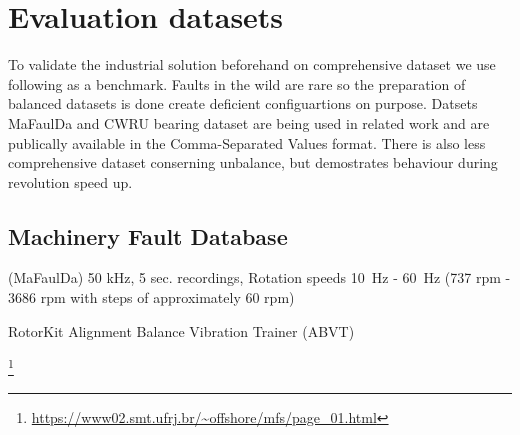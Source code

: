 \section{Evaluation datasets}



To validate the industrial solution beforehand on comprehensive dataset we use following as a benchmark.  Faults in the wild are rare so the preparation of balanced datasets is done create deficient configuartions on purpose. Datsets MaFaulDa and CWRU bearing dataset are being used in related work and are publically available in the Comma-Separated Values format. There is also less comprehensive dataset conserning unbalance, but demostrates behaviour during revolution speed up.  

\subsection{Machinery Fault Database}
(MaFaulDa)
50 kHz, 5 sec. recordings, 
Rotation speeds 10~Hz - 60~Hz (737 rpm - 3686 rpm with steps of approximately 60 rpm)







RotorKit Alignment Balance Vibration Trainer (ABVT)
\cite{pestana-viana_influence_2016}
\cite{ribeiro_rotating_2017}

 \footnote{\url{https://www02.smt.ufrj.br/~offshore/mfs/page_01.html}}

